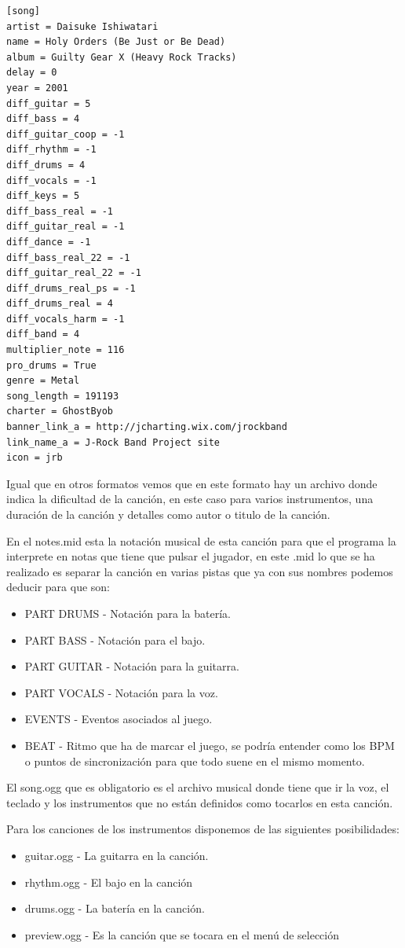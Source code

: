 \documentclass[a4paper,11pt,oneside]{book}
\begin{document}
\begin{Verbatim}[frame=single]
[song]
artist = Daisuke Ishiwatari
name = Holy Orders (Be Just or Be Dead)
album = Guilty Gear X (Heavy Rock Tracks)
delay = 0
year = 2001
diff_guitar = 5
diff_bass = 4
diff_guitar_coop = -1
diff_rhythm = -1
diff_drums = 4
diff_vocals = -1
diff_keys = 5
diff_bass_real = -1
diff_guitar_real = -1
diff_dance = -1
diff_bass_real_22 = -1
diff_guitar_real_22 = -1
diff_drums_real_ps = -1
diff_drums_real = 4
diff_vocals_harm = -1
diff_band = 4
multiplier_note = 116
pro_drums = True
genre = Metal
song_length = 191193
charter = GhostByob
banner_link_a = http://jcharting.wix.com/jrockband
link_name_a = J-Rock Band Project site
icon = jrb
\end{Verbatim}

Igual que en otros formatos vemos que en este formato hay un archivo donde indica la dificultad de la canción, en este caso para varios instrumentos, una duración de la canción y detalles como autor o titulo de la canción.

En el notes.mid esta la notación musical de esta canción  para que el programa la interprete en notas que tiene que pulsar el jugador, en este .mid lo que se ha realizado es separar la canción en varias pistas que ya con sus nombres podemos deducir para que son:

\begin{itemize}
\item PART DRUMS - Notación para la batería.
\item PART BASS - Notación para el bajo.
\item PART GUITAR - Notación para la guitarra.
\item PART VOCALS - Notación para la voz.
\item EVENTS - Eventos asociados al juego.
\item BEAT - Ritmo que ha de marcar el juego, se podría entender como los BPM o puntos de sincronización para que todo suene en el mismo momento.
\end{itemize}


El song.ogg que es obligatorio es el archivo musical donde tiene que ir la voz, el teclado y los instrumentos que no están definidos como tocarlos en esta canción.

Para los canciones de los instrumentos disponemos de las siguientes posibilidades:

\begin{itemize}
\item guitar.ogg - La guitarra en la canción.
\item rhythm.ogg - El bajo en la canción
\item drums.ogg - La batería en la canción.
\item preview.ogg - Es la canción que se tocara en el menú de selección
\end{itemize}
\end{document}
